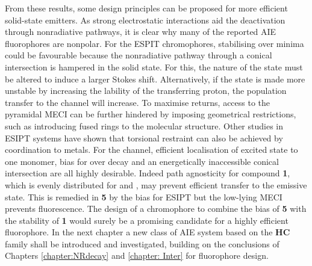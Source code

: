 From these results, some design principles can be proposed for more efficient solid-state emitters. As strong electrostatic interactions aid the deactivation through nonradiative pathways, it is clear why many of the reported AIE fluorophores are nonpolar. For the ESPIT chromophores, stabilising \Estar{} over \Kstar{} minima could be favourable because the \Estar{} nonradiative pathway through a conical intersection is hampered in the solid state. For this, the nature of the \Estar{} state must be altered to induce a larger Stokes shift. Alternatively, if the \Estar{} state is made more unstable by increasing the lability of the transferring proton, the population transfer to the \Kstar{} channel will increase. To maximise returns, access to the pyramidal \Kstar{} MECI can be further hindered by imposing geometrical restrictions, such as introducing fused rings to the molecular structure. Other studies in ESIPT systems have shown that torsional restraint can also be achieved by coordination to metals.\cite{Karsili2016} For the \Kstar{} channel, efficient localisation of excited state to one monomer, bias for \Kstar{} over \Estar{} decay and an energetically inaccessible conical intersection are all highly desirable. Indeed path agnosticity for compound \textbf{1}, which is evenly distributed for \Estar{} and \Kstar{}, may prevent efficient transfer to the emissive \Kstar{} state. This is remedied in \textbf{5} by the bias for ESIPT but the low-lying MECI prevents fluorescence. The design of a chromophore to combine the \Kstar{} bias of \textbf{5} with the stability of \textbf{1} would surely be a promising candidate for a highly efficient fluorophore.  In the next chapter a new class of AIE system based on the \textbf{HC} family shall be introduced and investigated, building on the conclusions of Chapters \ref{chapter:NRdecay} and \ref{chapter: Inter} for fluorophore design. 